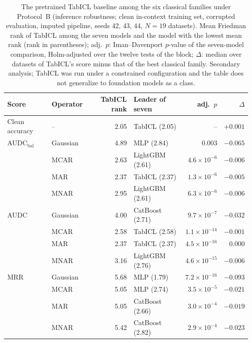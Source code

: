 \documentclass[pdflatex,sn-mathphys]{sn-jnl}
\theoremstyle{thmstyleone}
\theoremstyle{thmstyletwo}
\theoremstyle{thmstylethree}
\begin{document}
\begin{table}[t]
\centering
\footnotesize
\caption{The pretrained TabICL baseline among the six classical families under Protocol~B (inference robustness; clean in-context training set, corrupted evaluation, imputed pipeline, seeds 42, 43, 44, $N=19$ datasets). Mean Friedman rank of TabICL among the seven models and the model with the lowest mean rank (rank in parentheses); adj.\ $p$: Iman--Davenport $p$-value of the seven-model comparison, Holm-adjusted over the twelve tests of the block; $\Delta$: median over datasets of TabICL's score minus that of the best classical family. Secondary analysis; TabICL was run under a constrained configuration and the table does not generalize to foundation models as a class.}
\label{tab:foundation}
\begin{tabular}{@{}llrlrr@{}}
\toprule
Score & Operator & TabICL rank & Leader of seven & adj.\ $p$ & $\Delta$ \\
\midrule
Clean accuracy & -- & 2.05 & TabICL (2.05) & -- & $+0.001$ \\
\midrule
AUDC$_{\mathrm{bal}}$ & Gaussian & 4.89 & MLP (2.84) & 0.003 & $-0.065$ \\
 & MCAR & 2.63 & LightGBM (2.61) & $4.6\times10^{-6}$ & $-0.006$ \\
 & MAR & 2.37 & TabICL (2.37) & $1.3\times10^{-6}$ & $-0.005$ \\
 & MNAR & 2.95 & LightGBM (2.61) & $6.3\times10^{-6}$ & $-0.006$ \\
\midrule
AUDC & Gaussian & 4.00 & CatBoost (2.71) & $9.7\times10^{-7}$ & $-0.032$ \\
 & MCAR & 2.58 & TabICL (2.58) & $1.1\times10^{-14}$ & $-0.001$ \\
 & MAR & 2.37 & TabICL (2.37) & $4.5\times10^{-16}$ & $0.000$ \\
 & MNAR & 3.16 & LightGBM (2.76) & $4.6\times10^{-15}$ & $-0.006$ \\
\midrule
MRR & Gaussian & 5.68 & MLP (1.79) & $7.2\times10^{-16}$ & $-0.093$ \\
 & MCAR & 5.05 & MLP (2.74) & $3.5\times10^{-5}$ & $-0.021$ \\
 & MAR & 5.05 & CatBoost (2.66) & $3.0\times10^{-4}$ & $-0.019$ \\
 & MNAR & 5.42 & CatBoost (2.82) & $2.9\times10^{-4}$ & $-0.023$ \\
\bottomrule
\end{tabular}
\end{table}
\end{document}
